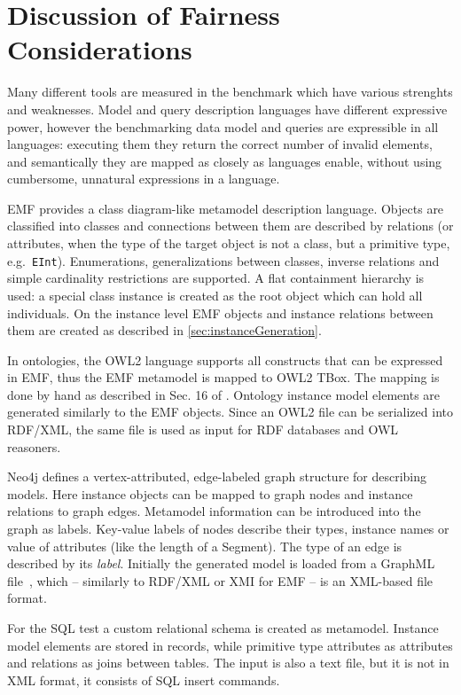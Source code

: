 \section{Discussion of Fairness Considerations}
Many different tools are measured in the benchmark which have various strenghts
and weaknesses. Model and query description languages have different expressive
power, however the benchmarking data model and queries are expressible in all
languages: executing them they return the correct number of invalid elements,
and semantically they are mapped as closely as languages enable, without using
cumbersome, unnatural expressions in a language.

EMF provides a class diagram-like metamodel description language. Objects are
classified into classes and connections between them are described by relations
(or attributes, when the type of the target object is not a class, but a primitive
type, e.g.\ \texttt{EInt}). Enumerations, generalizations between classes, inverse
relations and simple cardinality restrictions are supported. A flat containment
hierarchy is used: a special class instance is created as the root object which can
hold all individuals. On the instance level EMF objects and instance relations between them 
are created as described in \autoref{sec:instanceGeneration}.

In ontologies, the OWL2 language supports all constructs that can be expressed in
EMF, thus the EMF metamodel is mapped to OWL2 TBox. The mapping is done by hand as
described in Sec. 16 of \cite{OMG2009ODM}. Ontology instance model elements are
generated similarly to the EMF objects. Since an OWL2 file can be serialized
into RDF/XML, the same file is used as input for RDF databases and OWL
reasoners.

Neo4j defines a vertex-attributed, edge-labeled graph structure for describing
models. Here instance objects can be mapped to graph nodes and instance
relations to graph edges. Metamodel information can be introduced into the graph
as labels. Key-value labels of nodes describe their types, instance names or
value of attributes (like the length of a Segment). The type of an edge is described by its \emph{label}.
Initially the generated model is loaded from a GraphML file~\cite{GraphML},
which -- similarly to RDF/XML or XMI for EMF -- is an XML-based file format.

For the SQL test a custom relational schema is created as metamodel. Instance
model elements are stored in records, while primitive type attributes as
attributes and relations as joins between tables. The input is also a text
file, but it is not in XML format, it consists of SQL insert commands.

